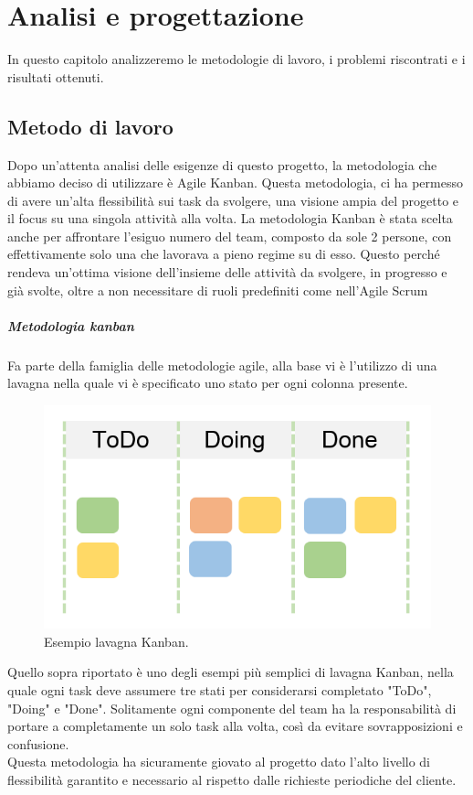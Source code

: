 \chapter{Analisi e progettazione}
In questo capitolo analizzeremo le metodologie di lavoro, i problemi riscontrati e i risultati ottenuti.
\section{Metodo di lavoro}
Dopo un'attenta analisi delle esigenze di questo progetto, la metodologia che abbiamo deciso di utilizzare è Agile Kanban. Questa metodologia, ci ha permesso di avere un'alta flessibilità sui task da svolgere, una visione ampia del progetto e il focus su una singola attività alla volta.
La metodologia Kanban è stata scelta anche per affrontare l'esiguo numero del team, composto da sole 2 persone, con effettivamente solo una che lavorava a pieno regime su di esso.
Questo perché rendeva un'ottima visione dell'insieme delle attività da svolgere, in progresso e già svolte, oltre a non necessitare di ruoli predefiniti come nell'\gls{Agile Scrum}
\paragraph{Metodologia kanban}
Fa parte della famiglia delle metodologie agile, alla base vi è l'utilizzo di una lavagna nella quale vi è specificato uno stato per ogni colonna presente.
\begin{figure}[h!]
	\centering
	\includegraphics[scale=0.3]{figures/kanban-board}
	\caption[Esempio lavagna Kanban.]{Esempio lavagna Kanban.
		\label{fig:logoGCP}}
\end{figure}	
Quello sopra riportato è uno degli esempi più semplici di lavagna Kanban, nella quale ogni task deve assumere tre stati per considerarsi completato "ToDo", "Doing" e "Done". Solitamente ogni componente del team ha la responsabilità di portare a completamente un solo task alla volta, così da evitare sovrapposizioni e confusione.
\\ 
Questa metodologia ha sicuramente giovato al progetto dato l'alto livello di flessibilità garantito e necessario al rispetto dalle richieste periodiche del cliente.
